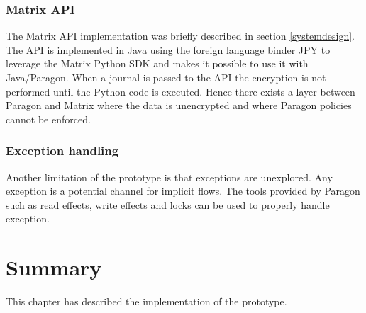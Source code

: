 \subsubsection{Matrix API}
The Matrix API implementation was briefly described in section \ref{systemdesign}. The API is implemented in Java using the foreign language binder JPY to leverage the Matrix Python SDK and makes it possible to use it with Java/Paragon. When a journal is passed to the API the encryption is not performed until the Python code is executed. Hence there exists a layer between Paragon and Matrix where the data is unencrypted and where Paragon policies cannot be enforced.

\subsubsection{Exception handling}
Another limitation of the prototype is that exceptions are unexplored. Any exception is a potential channel for implicit flows. The tools provided by Paragon such as read effects, write effects and locks can be used to properly handle exception.





\section{Summary}
This chapter has described the implementation of the prototype. 